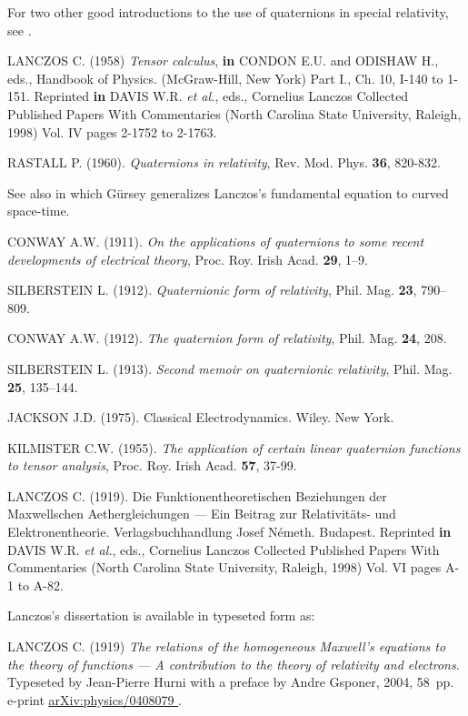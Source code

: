 \documentclass [12pt,a4paper      ]{article}
\begin{document}
\begin{enumerate}
For two other good introductions to the use of quaternions in special 
relativity, see \cite{R5,R8}.

 LANCZOS C. (1958) \emph{Tensor calculus}, {\bf in}  CONDON E.U. and ODISHAW H., eds., Handbook of Physics. (McGraw-Hill, New York) Part I., Ch. 10, I-140 to 1-151.  Reprinted  {\bf in} DAVIS W.R. \emph{et al.}, eds., Cornelius Lanczos Collected Published Papers With Commentaries (North Ca\-rolina State University, Raleigh, 1998) Vol. IV pages 2-1752 to 2-1763.

 RASTALL P. (1960). \emph{Quaternions in relativity},  Rev. Mod. Phys. {\bf 36}, 820-832.

See also \cite{R29} in which G\"ursey generalizes Lanczos's fundamental equation to curved space-time.

  CONWAY A.W. (1911). \emph{On the applications of quaternions to some recent developments of electrical theory},  Proc. Roy. Irish Acad.  {\bf 29}, 1--9.

 SILBERSTEIN L. (1912). \emph{Quaternionic form of relativity}, Phil. Mag. {\bf 23}, 790--809.
 
CONWAY A.W.  (1912). \emph{The quaternion form of relativity}, Phil.  Mag.  
 {\bf 24}, 208.

   SILBERSTEIN   L.   (1913). \emph{Second  memoir  on   quaternionic relativity}, Phil. Mag.   {\bf 25}, 135--144.

  JACKSON J.D.  (1975). Classical Electrodynamics.    Wiley.  New 
York.

  KILMISTER  C.W.  (1955). \emph{The application  of  certain  linear quaternion functions to tensor analysis}, Proc.  Roy. Irish Acad.   {\bf 57}, 
37-99.

 LANCZOS C.  (1919). Die Funktionentheoretischen Beziehungen 
der Max\-well\-schen  Aethergleichungen --- Ein Beitrag  zur  Relativit\"ats- und  Elektronentheorie. Verlagsbuchhandlung Josef N\'emeth. Budapest. Reprinted  {\bf in} DAVIS W.R. \emph{et al.}, eds., Cornelius Lanczos Collected Published Papers With Commentaries (North Ca\-rolina State University, Raleigh, 1998) Vol. VI pages A-1 to A-82.

Lanczos's dissertation is available in typeseted form as: 

LANCZOS C.  (1919) \emph{The relations of the homogeneous Maxwell's equations to the theory of functions --- A contribution to the theory of relativity and electrons}. Typeseted by Jean-Pierre Hurni with a preface by Andre Gsponer, 2004, 58~pp.  e-print \underline{ arXiv:physics/0408079 }. 


\end{enumerate}
\end{document}
